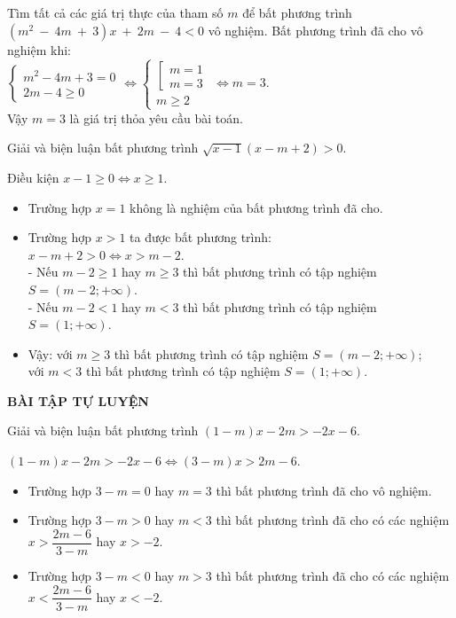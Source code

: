 \begin{vd}%
	Tìm tất cả các giá trị thực của tham số $m$ để bất phương trình $(m^2~-~4m~+~3)x ~+~2m ~-~ 4 < 0$ vô nghiệm.
	\loigiai
	{
		Bất phương trình đã cho vô nghiệm khi:\\
		$\left\{\begin{array}{l}
		m^2-4m+3 =0\\ 2m-4 \geq 0
		\end{array}  \right. 
		\Leftrightarrow \left\{\begin{array}{l}
		\left[\begin{array}{l}
		m=1 \\ m=3
		\end{array}  \right. \\ m \geq 2
		\end{array}  \right. \Leftrightarrow m = 3$.\\
		Vậy $m=3$ là giá trị thỏa yêu cầu bài toán.
	}
\end{vd}

\begin{vd}%
	Giải và biện luận bất phương trình $\sqrt{x-1}\left(x-m+2\right)>0$.
	\loigiai
	{
		Điều kiện $x-1 \geq 0 \Leftrightarrow x \geq 1$.
		\begin{itemize}
			\item Trường hợp $x=1$ không là nghiệm của bất phương trình đã cho.
			\item Trường hợp $x>1$ ta được bất phương trình:\\
			$x-m+2 >0 \Leftrightarrow x > m-2$.\\
			- Nếu $m-2 \geq 1$ hay $m \geq 3$ thì bất phương trình có tập nghiệm $S = \left(m-2; +\infty\right)$.\\
			- Nếu $m-2 < 1$ hay $m < 3$ thì bất phương trình có tập nghiệm $S = \left(1; +\infty\right)$.
			\item Vậy: với $m \geq 3$ thì bất phương trình có tập nghiệm $S = \left(m-2; +\infty\right)$;\\
			với $m < 3$ thì bất phương trình có tập nghiệm $S = \left(1;+\infty \right)$.
		\end{itemize}
	}
\end{vd}
\begin{center}
	\textbf{BÀI TẬP TỰ LUYỆN}
\end{center}

\setcounter{bt}{0}
\begin{bt}%
	Giải và biện luận bất phương trình $(1-m)x-2m>-2x-6$.
	\loigiai
	{
		$(1-m)x-2m>-2x-6 \Leftrightarrow (3-m)x > 2m-6$.
		\begin{itemize}
			\item Trường hợp $3-m = 0$ hay $m=3$ thì bất phương trình đã cho vô nghiệm.
			\item Trường hợp $3-m >0$ hay $m < 3$ thì bất phương trình đã cho có các nghiệm $x > \dfrac{2m-6}{3-m}$ hay $x>-2$.
			\item Trường hợp $3-m <0$ hay $m > 3$ thì bất phương trình đã cho có các nghiệm $x < \dfrac{2m-6}{3-m}$ hay $x<-2$.
		\end{itemize}
	}
\end{bt}


